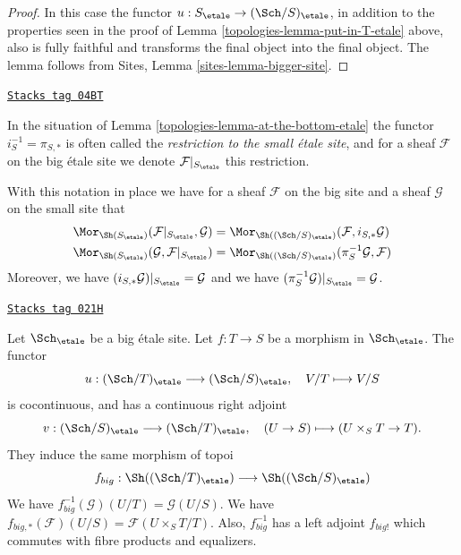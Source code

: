 \begin{proof}

In this case the functor
$u : S_\etale \to (\Sch/S)_\etale$,
in addition to the properties seen in the proof of
Lemma \ref{topologies-lemma-put-in-T-etale} above, also is fully faithful
and transforms the final object into the final object.
The lemma follows from Sites, Lemma \ref{sites-lemma-bigger-site}.
\end{proof}

\begin{definition}
\label{topologies-definition-restriction-small-etale}
\href{https://stacks.math.columbia.edu/tag/04BT}{\texttt{Stacks tag 04BT}}

In the situation of
Lemma \ref{topologies-lemma-at-the-bottom-etale}
the functor $i_S^{-1} = \pi_{S, *}$ is often
called the {\it restriction to the small \'etale site}, and for a sheaf
$\mathcal{F}$ on the big \'etale site we denote
$\mathcal{F}|_{S_\etale}$ this restriction.
\end{definition}

With this notation in place we have for a sheaf $\mathcal{F}$ on the
big site and a sheaf $\mathcal{G}$ on the small site that
\begin{align*}
\Mor_{\Sh(S_\etale)}(
\mathcal{F}|_{S_\etale},
\mathcal{G})
& =
\Mor_{\Sh((\Sch/S)_\etale)}(
\mathcal{F},
i_{S, *}\mathcal{G}) \\
\Mor_{\Sh(S_\etale)}(
\mathcal{G},
\mathcal{F}|_{S_\etale})
& =
\Mor_{\Sh((\Sch/S)_\etale)}(
\pi_S^{-1}\mathcal{G},
\mathcal{F})
\end{align*}
Moreover, we have $(i_{S, *}\mathcal{G})|_{S_\etale} = \mathcal{G}$
and we have $(\pi_S^{-1}\mathcal{G})|_{S_\etale} = \mathcal{G}$.

\begin{lemma}
\label{topologies-lemma-morphism-big-etale}
\href{https://stacks.math.columbia.edu/tag/021H}{\texttt{Stacks tag 021H}}

Let $\Sch_\etale$ be a big \'etale site.
Let $f : T \to S$ be a morphism in $\Sch_\etale$.
The functor
$$
u :
(\Sch/T)_\etale
\longrightarrow
(\Sch/S)_\etale,
\quad
V/T \longmapsto V/S
$$
is cocontinuous, and has a continuous right adjoint
$$
v :
(\Sch/S)_\etale
\longrightarrow
(\Sch/T)_\etale,
\quad
(U \to S) \longmapsto (U \times_S T \to T).
$$
They induce the same morphism of topoi
$$
f_{big} :
\Sh((\Sch/T)_\etale)
\longrightarrow
\Sh((\Sch/S)_\etale)
$$
We have $f_{big}^{-1}(\mathcal{G})(U/T) = \mathcal{G}(U/S)$.
We have $f_{big, *}(\mathcal{F})(U/S) = \mathcal{F}(U \times_S T/T)$.
Also, $f_{big}^{-1}$ has a left adjoint $f_{big!}$ which commutes with
fibre products and equalizers.
\end{lemma}

